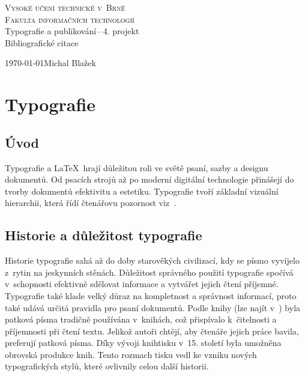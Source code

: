 \documentclass[a4paper, 11pt]{article}
\begin{document}
\begin{titlepage}
\begin{center}
    \Huge
    \textsc{Vysoké učení technické v~Brně\\
    \huge{Fakulta informačních technologií}}\\
    \LARGE{Typografie a publikování\,--\,4. projekt}\\
    \Huge{Bibliografické citace}\\
\end{center}
{\Large \today \hfill Michal Blažek}
\end{titlepage}

\section{Typografie}

\subsection{Úvod}

Typografie a \LaTeX~hrají důležitou roli ve světě psaní, sazby a designu dokumentů. Od psacích strojů až po moderní digitální technologie přinášejí do tvorby dokumentů efektivitu a estetiku. Typografie tvoří základní vizuální hierarchii, která řídí čtenářovu pozornost viz~\cite{Kottwitz2011}.

\subsection{Historie a důležitost typografie}

Historie typografie sahá až do doby starověkých civilizací, kdy se písmo vyvíjelo z~rytin na jeskynních stěnách. Důležitost správného použití typografie spočívá v~schopnosti efektivně sdělovat informace a vytvářet jejich čtení příjemné. Typografie také klade velký důraz na kompletnost a správnost informací, proto také udává určitá pravidla pro psaní dokumentů. Podle knihy  (lze najít v~\cite{Saltz2010}) byla patková písma tradičně používána v~knihách, což přispívalo k~čitelnosti a příjemnosti při čtení textu. Jelikož autoři chtějí, aby čtenáře jejich práce bavila, preferují patková písma. Díky vývoji knihtisku v~15. století byla umožněna obrovská produkce knih. Tento rozmach tisku vedl ke vzniku nových typografických stylů, které ovlivnily celou další historii.
\end{document}
